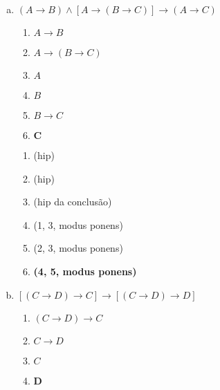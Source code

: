 \documentclass[a4paper, 12pt, addpoints]{exam}
\begin{document}
\begin{questions}
\begin{resp}
\begin{enumerate}[a)]
\begin{multicols}{2}
        \columnbreak

        \begin{enumerate}[\ding{32}]
          \item (hip)
          \item (hip)
          \item \textbf{(1,2,modus tollens)}
        \end{enumerate}

        \end{multicols}

      \item $(A \rightarrow B) \wedge [A \rightarrow (B \rightarrow C)] \rightarrow (A \rightarrow C)$ \\
      \begin{multicols}{2}

        \begin{enumerate}[1.]
          \item $A \rightarrow B$
          \item $A \rightarrow (B \rightarrow C)$
          \item $A$
          \item $B$
          \item $B \rightarrow C$
          \item $\boldsymbol{C}$
        \end{enumerate}
        
        \columnbreak

        \begin{enumerate}[\ding{32}]
          \item (hip)
          \item (hip)
          \item (hip da conclusão)
          \item (1, 3, modus ponens)
          \item (2, 3, modus ponens)
          \item \textbf{(4, 5, modus ponens)}
        \end{enumerate}

      \end{multicols}
      
      \item $[(C \rightarrow D) \rightarrow C] \rightarrow [(C \rightarrow D) \rightarrow D]$ \\
      \begin{multicols}{2}

        \begin{enumerate}[1.]
          \item $(C \rightarrow D) \rightarrow C$
          \item $C \rightarrow D$
          \item $C$
          \item $\boldsymbol{D}$
        \end{enumerate}
        

\end{multicols}
\end{enumerate}
\end{resp}
\end{questions}
\end{document}
